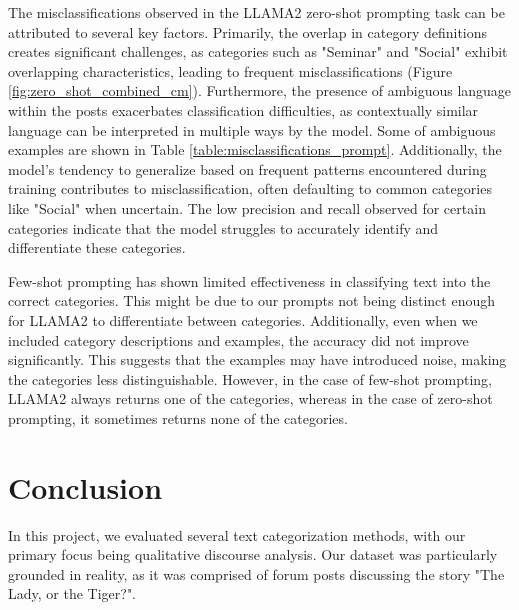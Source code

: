 \documentclass[fleqn,moreauthors,10pt]{ds_report}
\begin{document}
The misclassifications observed in the LLAMA2 zero-shot prompting task can be attributed to several key factors. Primarily, the overlap in category definitions creates significant challenges, as categories such as "Seminar" and "Social" exhibit overlapping characteristics, leading to frequent misclassifications (Figure \ref{fig:zero_shot_combined_cm}). Furthermore, the presence of ambiguous language within the posts exacerbates classification difficulties, as contextually similar language can be interpreted in multiple ways by the model. Some of ambiguous examples are shown in Table \ref{table:misclassifications_prompt}. Additionally, the model’s tendency to generalize based on frequent patterns encountered during training contributes to misclassification, often defaulting to common categories like "Social" when uncertain. The low precision and recall observed for certain categories indicate that the model struggles to accurately identify and differentiate these categories.



Few-shot prompting has shown limited effectiveness in classifying text into the correct categories. This might be due to our prompts not being distinct enough for LLAMA2 to differentiate between categories. Additionally, even when we included category descriptions and examples, the accuracy did not improve significantly. This suggests that the examples may have introduced noise, making the categories less distinguishable. However, in the case of few-shot prompting, LLAMA2 always returns one of the categories, whereas in the case of zero-shot prompting, it sometimes returns none of the categories.


\section*{Conclusion}


In this project, we evaluated several text categorization methods, with our primary focus being qualitative discourse analysis. Our dataset was particularly grounded in reality, as it was comprised of forum posts discussing the story "The Lady, or the Tiger?". 
\end{document}
